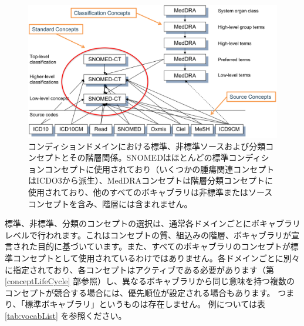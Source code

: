 \documentclass[
  11pt]{book}
\theoremstyle{definition}
\theoremstyle{definition}
\theoremstyle{definition}
\theoremstyle{definition}
\theoremstyle{remark}
\begin{document}
\begin{figure}

{\centering \includegraphics[width=1\linewidth]{images/StandardizedVocabularies/hierarchy} 

}

\caption{コンディションドメインにおける標準、非標準ソースおよび分類コンセプトとその階層関係。SNOMEDはほとんどの標準コンディションコンセプトに使用されており（いくつかの腫瘍関連コンセプトはICDO3から派生）、MedDRAコンセプトは階層分類コンセプトに使用されており、他のすべてのボキャブラリは非標準またはソースコンセプトを含み、階層には含まれません。}\label{fig:hierarchy}
\end{figure}

標準、非標準、分類のコンセプトの選択は、通常各ドメインごとにボキャブラリレベルで行われます。これはコンセプトの質、組込みの階層、ボキャブラリが宣言された目的に基づいています。また、すべてのボキャブラリのコンセプトが標準コンセプトとして使用されているわけではありません。各ドメインごとに別々に指定されており、各コンセプトはアクティブである必要があります（第 \ref{conceptLifeCycle} 部参照）し、異なるボキャブラリから同じ意味を持つ複数のコンセプトが競合する場合には、優先順位が設定される場合もあります。 つまり、「標準ボキャブラリ」というものは存在しません。 例については表 \ref{tab:vocabList} を参照ください。
\end{document}
